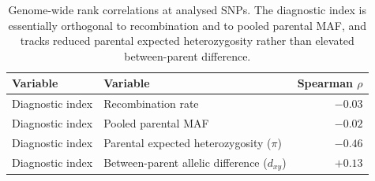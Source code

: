 \begin{table}[htbp]
\centering
\small
\caption{Genome-wide rank correlations at analysed SNPs. The diagnostic index is essentially orthogonal to recombination and to pooled parental MAF, and tracks reduced parental expected heterozygosity rather than elevated between-parent difference.}
\label{tab:corr}
\begin{tabular}{l l r}
\toprule
Variable & Variable & Spearman $\rho$ \\
\midrule
Diagnostic index & Recombination rate & $-0.03$ \\
Diagnostic index & Pooled parental MAF & $-0.02$ \\
Diagnostic index & Parental expected heterozygosity ($\pi$) & $-0.46$ \\
Diagnostic index & Between-parent allelic difference ($d_{xy}$) & $+0.13$ \\
\bottomrule
\end{tabular}
\end{table}
